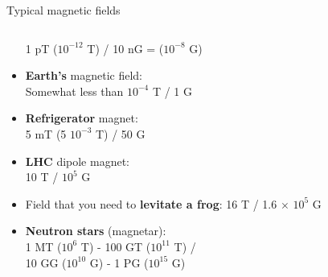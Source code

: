 \begin{frame}{Typical magnetic fields}
\begin{columns}
\begin{column}{0.60\textwidth}
\begin{itemize}
          {\color{blue}1 pT ($10^{-12}$ T)} / {\color{magenta}10 nG = ($10^{-8}$ G)}
     \item {\bf Earth's} magnetic field:\\
          Somewhat less than {\color{blue} $10^{-4}$ T} / {\color{magenta} 1 G }
     \item {\bf Refrigerator} magnet:\\
           {\color{blue} 5 mT (5 $10^{-3}$ T)} /  {\color{magenta} 50 G}
     \item {\bf LHC} dipole magnet:\\
           {\color{blue} 10 T} / {\color{magenta} $10^{5}$ G}
     \item Field that you need to {\bf levitate a frog}:
           {\color{blue} 16 T} / {\color{magenta} 1.6 $\times$ $10^{5}$ G}
     \item {\bf Neutron stars} (magnetar):\\
            {\color{blue} 1 MT ($10^{6}$ T) - 100 GT ($10^{11}$ T)} / \\
            {\color{magenta} 10 GG ($10^{10}$ G) - 1 PG ($10^{15}$ G)}
   \end{itemize}
  \end{column}
\end{columns}

\end{frame}

%
%
%

